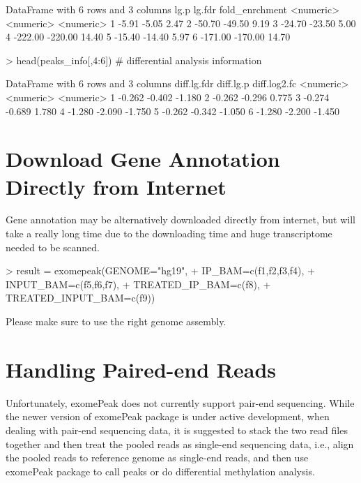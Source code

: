 \documentclass[]{article}
\begin{document}
{\begin{Schunk}
\begin{Soutput}
DataFrame with 6 rows and 3 columns
       lg.p    lg.fdr fold_enrchment
  <numeric> <numeric>      <numeric>
1     -5.91     -5.05           2.47
2    -50.70    -49.50           9.19
3    -24.70    -23.50           5.00
4   -222.00   -220.00          14.40
5    -15.40    -14.40           5.97
6   -171.00   -170.00          14.70
\end{Soutput}
\begin{Sinput}
> head(peaks_info[,4:6]) # differential analysis information
\end{Sinput}
\begin{Soutput}
DataFrame with 6 rows and 3 columns
  diff.lg.fdr diff.lg.p diff.log2.fc
    <numeric> <numeric>    <numeric>
1      -0.262    -0.402       -1.180
2      -0.262    -0.296        0.775
3      -0.274    -0.689        1.780
4      -1.280    -2.090       -1.750
5      -0.262    -0.342       -1.050
6      -1.280    -2.200       -1.450
\end{Soutput}
\end{Schunk}



\section{Download Gene Annotation Directly from Internet} 
Gene annotation may be alternatively downloaded directly from internet, but will take a really long time due to the downloading time and huge transcriptome needed to be scanned.

\begin{Schunk}
\begin{Sinput}
> result = exomepeak(GENOME="hg19", 
+                    IP_BAM=c(f1,f2,f3,f4), 
+                    INPUT_BAM=c(f5,f6,f7),
+                    TREATED_IP_BAM=c(f8), 
+                    TREATED_INPUT_BAM=c(f9))
\end{Sinput}
\end{Schunk}
Please make sure to use the right genome assembly.

\section{Handling Paired-end Reads}
Unfortunately, exomePeak does not currently support pair-end sequencing. While the newer version of exomePeak package is under active development,
when dealing with pair-end sequencing data,
it is suggested to stack the two read files together and then treat the pooled reads as single-end sequencing data, i.e., align the pooled reads to reference genome as single-end reads, and then use exomePeak package to call peaks or do differential methylation analysis.

}
\end{document}
